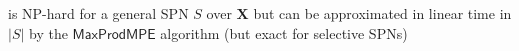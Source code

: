 \documentclass[xcolor={usenames,dvipsnames,svgnames}, compress]{beamer}
\begin{document}
\begin{frame}[t]
    is NP-hard for a general
 SPN $S$ over $\mathbf{X}$ but can be approximated in linear
 time in $|S|$
 by the $\mathsf{MaxProdMPE}$ algorithm (but exact for selective
 SPNs)\par\bigskip
\end{frame}
\end{document}
